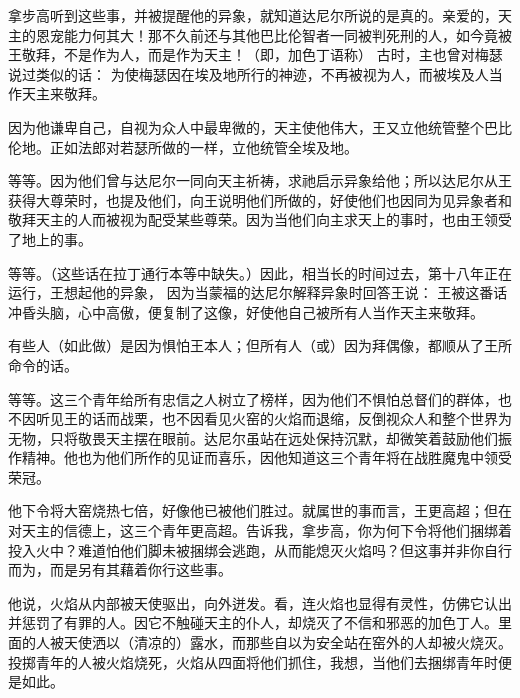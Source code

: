  拿步高听到这些事，并被提醒他的异象，就知道达尼尔所说的是真的。亲爱的，天主的恩宠能力何其大！那不久前还与其他巴比伦智者一同被判死刑的人，如今竟被王敬拜，不是作为人，而是作为天主！（即，加色丁语称） 古时，主也曾对梅瑟说过类似的话： 为使梅瑟因在埃及地所行的神迹，不再被视为人，而被埃及人当作天主来敬拜。\par

 因为他谦卑自己，自视为众人中最卑微的，天主使他伟大，王又立他统管整个巴比伦地。正如法郎对若瑟所做的一样，立他统管全埃及地。\par

 等等。因为他们曾与达尼尔一同向天主祈祷，求祂启示异象给他；所以达尼尔从王获得大尊荣时，也提及他们，向王说明他们所做的，好使他们也因同为见异象者和敬拜天主的人而被视为配受某些尊荣。因为当他们向主求天上的事时，也由王领受了地上的事。\par

  等等。（这些话在拉丁通行本等中缺失。）因此，相当长的时间过去，第十八年正在运行，王想起他的异象， 因为当蒙福的达尼尔解释异象时回答王说： 王被这番话冲昏头脑，心中高傲，便复制了这像，好使他自己被所有人当作天主来敬拜。\par

 有些人（如此做）是因为惧怕王本人；但所有人（或）因为拜偶像，都顺从了王所命令的话。\par

 等等。这三个青年给所有忠信之人树立了榜样，因为他们不惧怕总督们的群体，也不因听见王的话而战栗，也不因看见火窑的火焰而退缩，反倒视众人和整个世界为无物，只将敬畏天主摆在眼前。达尼尔虽站在远处保持沉默，却微笑着鼓励他们振作精神。他也为他们所作的见证而喜乐，因他知道这三个青年将在战胜魔鬼中领受荣冠。\par

 他下令将大窑烧热七倍，好像他已被他们胜过。就属世的事而言，王更高超；但在对天主的信德上，这三个青年更高超。告诉我，拿步高，你为何下令将他们捆绑着投入火中？难道怕他们脚未被捆绑会逃跑，从而能熄灭火焰吗？但这事并非你自行而为，而是另有其藉着你行这些事。\par

 他说，火焰从内部被天使驱出，向外迸发。看，连火焰也显得有灵性，仿佛它认出并惩罚了有罪的人。因它不触碰天主的仆人，却烧灭了不信和邪恶的加色丁人。里面的人被天使洒以（清凉的）露水，而那些自以为安全站在窑外的人却被火烧灭。投掷青年的人被火焰烧死，火焰从四面将他们抓住，我想，当他们去捆绑青年时便是如此。\par

